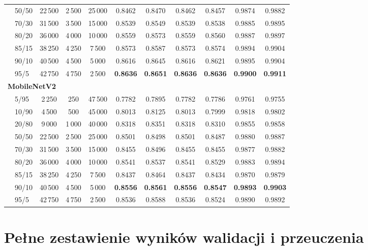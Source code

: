\documentclass[12pt,a4paper]{article}
\begin{document}
\begin{table}[H]
{\begin{tabular}{llccccccccc}
        & 50/50  & 22\,500 & 2\,500 & 25\,000 & 0.8462 & 0.8470 & 0.8462 & 0.8457 & 0.9874 & 0.9882 \\
        & 70/30  & 31\,500 & 3\,500 & 15\,000 & 0.8539 & 0.8549 & 0.8539 & 0.8538 & 0.9885 & 0.9895 \\
        & 80/20  & 36\,000 & 4\,000 & 10\,000 & 0.8559 & 0.8573 & 0.8559 & 0.8560 & 0.9887 & 0.9897 \\
        & 85/15  & 38\,250 & 4\,250 & 7\,500  & 0.8573 & 0.8587 & 0.8573 & 0.8574 & 0.9894 & 0.9904 \\
        & 90/10  & 40\,500 & 4\,500 & 5\,000  & 0.8616 & 0.8645 & 0.8616 & 0.8621 & 0.9895 & 0.9904 \\
        & 95/5   & 42\,750 & 4\,750 & 2\,500  & \textbf{0.8636} & \textbf{0.8651} & \textbf{0.8636} & \textbf{0.8636} & \textbf{0.9900} & \textbf{0.9911} \\
        \midrule
        \multicolumn{11}{l}{\textbf{MobileNetV2}} \\
        \midrule
        & 5/95   & 2\,250  & 250   & 47\,500 & 0.7782 & 0.7895 & 0.7782 & 0.7786 & 0.9761 & 0.9755 \\
        & 10/90  & 4\,500  & 500   & 45\,000 & 0.8013 & 0.8125 & 0.8013 & 0.7999 & 0.9818 & 0.9802 \\
        & 20/80  & 9\,000  & 1\,000 & 40\,000 & 0.8318 & 0.8351 & 0.8318 & 0.8310 & 0.9855 & 0.9858 \\
        & 50/50  & 22\,500 & 2\,500 & 25\,000 & 0.8501 & 0.8498 & 0.8501 & 0.8487 & 0.9880 & 0.9887 \\
        & 70/30  & 31\,500 & 3\,500 & 15\,000 & 0.8455 & 0.8496 & 0.8455 & 0.8455 & 0.9877 & 0.9882 \\
        & 80/20  & 36\,000 & 4\,000 & 10\,000 & 0.8541 & 0.8537 & 0.8541 & 0.8529 & 0.9883 & 0.9894 \\
        & 85/15  & 38\,250 & 4\,250 & 7\,500  & 0.8437 & 0.8464 & 0.8437 & 0.8434 & 0.9870 & 0.9879 \\
        & 90/10  & 40\,500 & 4\,500 & 5\,000  & \textbf{0.8556} & \textbf{0.8561} & \textbf{0.8556} & \textbf{0.8547} & \textbf{0.9893} & \textbf{0.9903} \\
        & 95/5   & 42\,750 & 4\,750 & 2\,500  & 0.8536 & 0.8588 & 0.8536 & 0.8524 & 0.9890 & 0.9892 \\
        \bottomrule
    \end{tabular}%
    }
\end{table}


\section{Pełne zestawienie wyników walidacji i przeuczenia}
\label{ad:overfitting_full}
\end{document}
